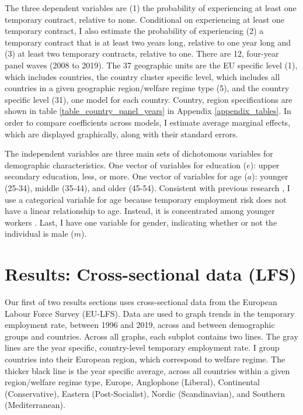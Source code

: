 \documentclass[12pt]{article}
\begin{document}
The three dependent variables are (1) the probability of experiencing at least one temporary contract, relative to none.  Conditional on experiencing at least one temporary contract, I also estimate the probability of experiencing (2) a temporary contract that is at least two years long, relative to one year long and (3) at least two temporary contracts, relative to one.  There are 12, four-year panel waves (2008 to 2019).  The 37 geographic units are the EU specific level (1), which includes countries, the country cluster specific level, which includes all countries in a given geographic region/welfare regime type (5), and the country specific level (31), one model for each country.  Country, region specifications are shown in table \ref{table_country_panel_years} in Appendix \ref{appendix_tables}.  In order to compare coefficients across models, I estimate average marginal effects, which are displayed graphically, along with their standard errors.

The independent variables are three main sets of dichotomous variables for demographic characteristics.  One vector of variables for education ($e$): upper secondary education, less, or more.  One vector of variables for age ($a$): younger (25-34), middle (35-44), and older (45-54).  Consistent with previous research \citep{booth_etal_2002}, I use a categorical variable for age because temporary employment risk does not have a linear relationship to age.  Instead, it is concentrated among younger workers \citep{hipp_etal_2015}.  Last, I have one variable for gender, indicating whether or not the individual is male ($m$).    

\section{Results: Cross-sectional data (LFS)}

Our first of two results sections uses cross-sectional data from the European Labour Force Survey (EU-LFS).  Data are used to graph trends in the temporary employment rate, between 1996 and 2019, across and between demographic groups and countries.  Across all graphs, each subplot contains two lines.  The gray lines are the year specific, country-level temporary employment rate.  I group countries into their European region, which correspond to welfare regime.  The thicker black line is the year specific average, across all countries within a given region/welfare regime type, Europe, Anglophone (Liberal), Continental (Conservative), Eastern (Post-Socialist), Nordic (Scandinavian), and Southern (Mediterranean).  
\end{document}

